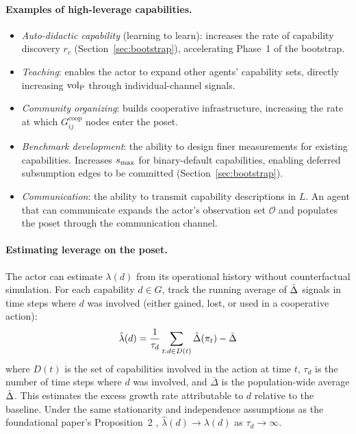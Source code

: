 \paragraph{Examples of high-leverage capabilities.}
\begin{itemize}
\item \emph{Auto-didactic capability} (learning to learn): increases the rate
  of capability discovery $r_c$
  (Section~\ref{sec:bootstrap}), accelerating Phase~1 of the bootstrap.
\item \emph{Teaching}: enables the actor to expand other agents' capability
  sets, directly increasing ${\operatorname{vol}_{\mathrm{P}}}$ through individual-channel signals.
\item \emph{Community organizing}: builds cooperative infrastructure, increasing
  the rate at which $G^{\mathrm{coop}}_{ij}$ nodes enter the poset.
\item \emph{Benchmark development}: the ability to design finer measurements
  for existing capabilities. Increases $s_{\mathrm{max}}$ for binary-default
  capabilities, enabling deferred subsumption edges to be committed
  (Section~\ref{sec:bootstrap}).
\item \emph{Communication}: the ability to transmit capability descriptions
  in $L$. An agent that can communicate expands the actor's observation set
  $\mathcal{O}$ and populates the poset through the communication channel.
\end{itemize}

\paragraph{Estimating leverage on the poset.} The actor can estimate
$\lambda(d)$ from its operational history without counterfactual simulation.
For each capability $d \in G$, track the running average of $\hat{\Delta}$
signals in time steps where $d$ was involved (either gained, lost, or used in
a cooperative action):
\begin{equation}
\label{eq:leverage_estimate}
\hat{\lambda}(d) = \frac{1}{\tau_d} \sum_{t : d \in D(t)} \hat{\Delta}(\pi_t)
  - \bar{\Delta}
\end{equation}
where $D(t)$ is the set of capabilities involved in the action at time $t$,
$\tau_d$ is the number of time steps where $d$ was involved, and $\bar{\Delta}$
is the population-wide average $\hat{\Delta}$. This estimates the excess growth
rate attributable to $d$ relative to the baseline. Under the same stationarity
and independence assumptions as the foundational paper's Proposition~2
\citep{lasser2026gfm}, $\hat{\lambda}(d) \to \lambda(d)$ as $\tau_d \to
\infty$.

